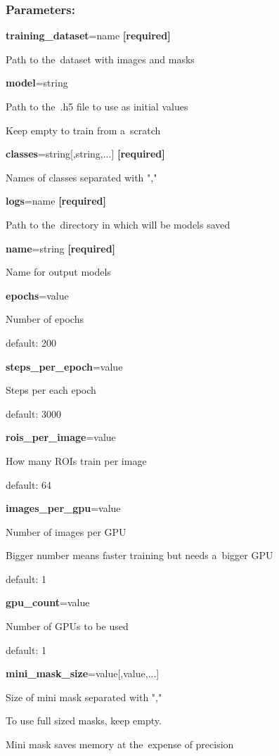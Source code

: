 \subsubsection*{Parameters:}

\begin{flushleft}
\textbf{training\_dataset}=name \textbf{[required]}

\tab Path to the~dataset with images and masks

\textbf{model}=string

\tab Path to the~.h5 file to use as initial values

\tab Keep empty to train from a~scratch

\textbf{classes}=string[,string,...] \textbf{[required]}
           
\tab Names of classes separated with ","

\textbf{logs}=name \textbf{[required]}

\tab Path to the~directory in which will be models saved

\textbf{name}=string \textbf{[required]}

\tab Name for output models

\textbf{epochs}=value

\tab Number of epochs

\tab default: 200

\textbf{steps\_per\_epoch}=value

\tab Steps per each epoch

\tab default: 3000

\textbf{rois\_per\_image}=value

\tab How many ROIs train per image

\tab default: 64

\textbf{images\_per\_gpu}=value

\tab Number of images per GPU

\tab Bigger number means faster training but needs a~bigger GPU

\tab default: 1

\textbf{gpu\_count}=value

\tab Number of GPUs to be used

\tab default: 1

\textbf{mini\_mask\_size}=value[,value,...]

\tab Size of mini mask separated with ","

\tab To use full sized masks, keep empty.

\tab Mini mask saves memory at the~expense of precision


\end{flushleft}
